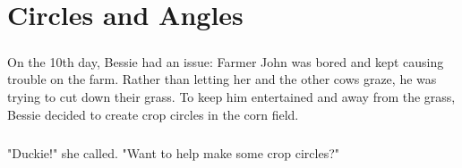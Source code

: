 \chapter{Circles and Angles}
\paragraph{} On the 10th day, Bessie had an issue: Farmer John was bored and kept causing trouble on the farm. Rather than letting her and the other cows graze, he was trying to cut down their grass. To keep him entertained and away from the grass, Bessie decided to create crop circles in the corn field.
\paragraph{} "Duckie!" she called. "Want to help make some crop circles?"
